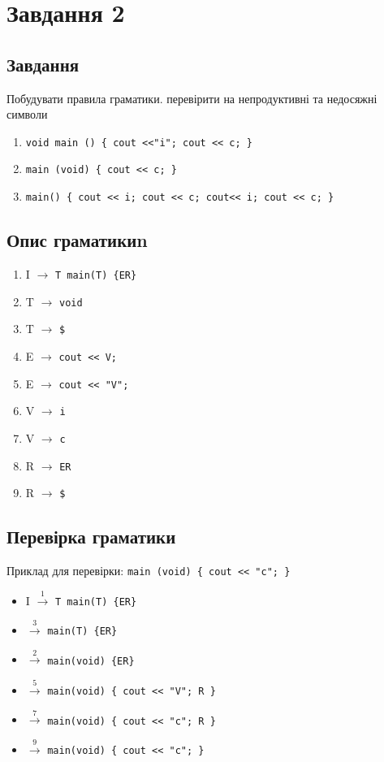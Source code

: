 \newpage
\section{Завдання 2}
\subsection{Завдання}
Побудувати правила граматики. перевірити на непродуктивні та недосяжні символи
\begin{enumerate}
    \item \verb|void main () { cout <<"i"; cout << c; }|
    \item \verb|main (void) { cout << c; }|
    \item \verb|main() { cout << i; cout << c; cout<< i; cout << c; }|
\end{enumerate}

\subsection{Опис граматикиn}
\begin{enumerate}
    \item  I $\to$ \verb|T main(T) {ER}|
    \item  T $\to$ \verb|void|
    \item  T $\to$ \verb|$|
    \item  E $\to$ \verb|cout << V;|
    \item  E $\to$ \verb|cout << "V";|
    \item  V $\to$ \verb|i|
    \item  V $\to$ \verb|c|
    \item  R $\to$ \verb|ER|
    \item  R $\to$ \verb|$|
\end{enumerate}


\newpage
\subsection{Перевірка граматики}
Приклад для перевірки: \verb|main (void) { cout << "c"; }|
\begin{itemize}
    \item[]  I $\xrightarrow{1}$ \verb|T main(T) {ER}|
    \item[]  $\xrightarrow{3}$ \verb|main(T) {ER}|
    \item[]  $\xrightarrow{2}$ \verb|main(void) {ER}|
    \item[]  $\xrightarrow{5}$ \verb|main(void) { cout << "V"; R }|
    \item[]  $\xrightarrow{7}$ \verb|main(void) { cout << "c"; R }|
    \item[]  $\xrightarrow{9}$ \verb|main(void) { cout << "c"; }|
\end{itemize}

